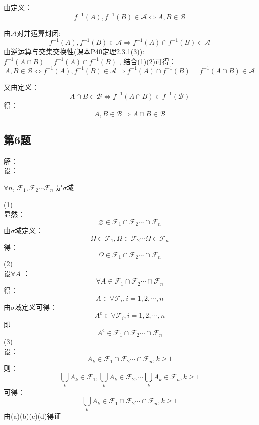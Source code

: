 \documentclass[10pt,a4paper]{article}
\begin{document}
由定义：
\[ 
f^{-1}(A),f^{-1}(B)\in\mathscr{A} \iff A,B\in \mathscr{B}
\tag{1} 
\] 


由$ \mathscr{A} $对并运算封闭:  
\[ 
f^{-1}(A),f^{-1}(B)\in\mathscr{A} \Rightarrow f^{-1}(A) \cap f^{-1}(B) \in\mathscr{A}
\tag{2} 
\]
由逆运算与交集交换性(课本P40定理2.3.1(3)): $  f^{-1}(A \cap B)=f^{-1}(A) \cap f^{-1}(B)  $ , 结合(1)(2)可得：
\[ 
A,B\in \mathscr{B} \iff f^{-1}(A),f^{-1}(B)\in\mathscr{A} \Rightarrow f^{-1}(A) \cap f^{-1}(B)=f^{-1}(A \cap B) \in\mathscr{A}
\]

又由定义：
\[ 
A \cap B \in\mathscr{B} \iff f^{-1}(A \cap B) \in f^{-1}(\mathscr{B})
\]
得： 
\[ 
A,B\in \mathscr{B}  \Rightarrow A \cap B \in \mathscr{B}
\]

\subsection{第6题}
解：\\
设： \\
\centerline{
$ {\forall n}  $, $  \mathscr{F}_{1},\mathscr{F}_{2} \cdots \mathscr{F}_{n} $ 是$ \sigma $域}
(1)\\
显然：
\[ \varnothing \in \mathscr{F}_{1} \cap \mathscr{F}_{2} \cdots \cap \mathscr{F}_{n} 
\tag{a}
\]
由$ \sigma $域定义：
\[ \Omega \in \mathscr{F}_{1}, \Omega \in \mathscr{F}_{2} \cdots \Omega \in \mathscr{F}_{n} 
\]
得：
\[ \Omega \in \mathscr{F}_{1} \cap \mathscr{F}_{2} \cdots \cap \mathscr{F}_{n} 
\tag{b}
\]
(2)\\
设$ \forall A$ ：
\[ \forall A \in \mathscr{F}_{1} \cap \mathscr{F}_{2} \cdots \cap \mathscr{F}_{n} \]
得：
\[ A \in \forall \mathscr{F}_{i}, i=1,2,\cdots,n \]
由$ \sigma $域定义可得：
 \[ A^{\mathrm{c}} \in \forall \mathscr{F}_{i}, i=1,2,\cdots,n \] 
即
\[ A^{\mathrm{c}} \in \mathscr{F}_{1} \cap \mathscr{F}_{2} \cdots \cap \mathscr{F}_{n}
\tag{c}
\]  
(3)\\
设：
\[ A_{k} \in \mathscr{F}_{1} \cap \mathscr{F}_{2} \cdots \cap \mathscr{F}_{n}, k\geq 1
\] 
则：
\[ \bigcup_{k} A_{k} \in \mathscr{F}_{1} , \bigcup_{k} A_{k} \in \mathscr{F}_{2}, \cdots \bigcup_{k} A_{k} \in \mathscr{F}_{n}, k\geq 1
\] 
可得：
\[ \bigcup_{k} A_{k} \in \mathscr{F}_{1} \cap \mathscr{F}_{2} \cdots \cap \mathscr{F}_{n}, k\geq 1
\tag{d}
\] 
由(a)(b)(c)(d)得证
\end{document}
